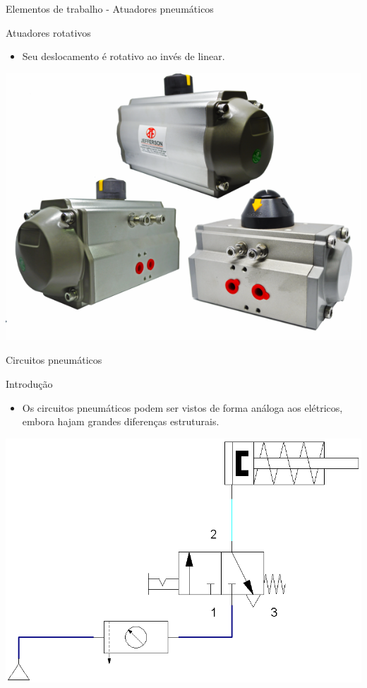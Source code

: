 \begin{frame}{Elementos de trabalho - Atuadores pneumáticos}
	\begin{block}{Atuadores rotativos}
		\begin{itemize}
			\item Seu deslocamento é rotativo ao invés de linear.
		\end{itemize}
	\end{block}
	
	\medskip
	
	\centering
	\includegraphics[width=0.6\linewidth]{Figuras/Ch14/fig39}
\end{frame}


\begin{frame}{Circuitos pneumáticos}
	\begin{block}{Introdução}
		\begin{itemize}
			\item Os circuitos pneumáticos podem ser vistos de forma análoga aos elétricos, embora hajam grandes diferenças estruturais.
		\end{itemize}
	\end{block}
	
	\medskip
	
	\centering
	\includegraphics[width=0.55\linewidth]{Figuras/Ch14/fig40}
\end{frame}


